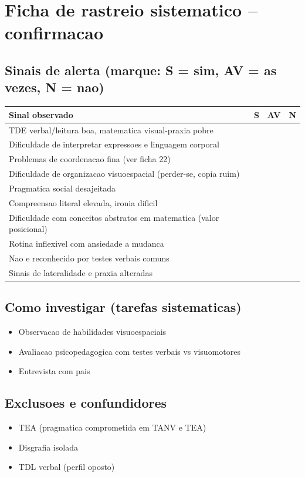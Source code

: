 \documentclass[a4paper,11pt]{book}
\begin{document}
\section*{Ficha de rastreio sistematico -- confirmacao}
\subsection*{Sinais de alerta (marque: S = sim, AV = as vezes, N = nao)}
\begin{tabular}{@{}p{11.5cm}ccc@{}}\toprule
Sinal observado & S & AV & N \\\midrule
TDE verbal/leitura boa, matematica visual-praxia pobre & & & \\
Dificuldade de interpretar expressoes e linguagem corporal & & & \\
Problemas de coordenacao fina (ver ficha 22) & & & \\
Dificuldade de organizacao visuoespacial (perder-se, copia ruim) & & & \\
Pragmatica social desajeitada & & & \\
Compreensao literal elevada, ironia dificil & & & \\
Dificuldade com conceitos abstratos em matematica (valor posicional) & & & \\
Rotina inflexivel com ansiedade a mudanca & & & \\
Nao e reconhecido por testes verbais comuns & & & \\
Sinais de lateralidade e praxia alteradas & & & \\
\bottomrule\end{tabular}
\subsection*{Como investigar (tarefas sistematicas)}
\begin{itemize}
\item Observacao de habilidades visuoespaciais
\item Avaliacao psicopedagogica com testes verbais vs visuomotores
\item Entrevista com pais
\end{itemize}
\subsection*{Exclusoes e confundidores}
\begin{itemize}
\item TEA (pragmatica comprometida em TANV e TEA)
\item Disgrafia isolada
\item TDL verbal (perfil oposto)
\end{itemize}
\end{document}
